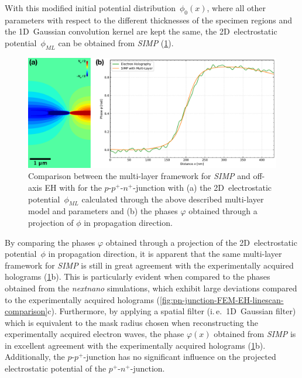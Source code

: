 With this modified initial potential distribution~$\phi_0 \left(x\right)$, where all other parameters with respect to the different thicknesses of the specimen regions and the 1D~Gaussian convolution kernel are kept the same, the 2D~electrostatic potential~$\phi_{\mathit{ML}}$ can be obtained from \emph{SIMP} (\cref{fig:ppn-junction-SIMP-multilayer-EH-comparison}).
\begin{figure}[H]
	\centering
	\includegraphics[width=\textwidth]{Figures/Results/pn-Junction/Simulations/ppn-junction-SIMP-multilayer-EH-comparison.pdf}
	\caption{Comparison between the multi-layer framework for \emph{SIMP} and off-axis EH with for the $p$-$p^+$-$n^+$-junction with (a) the 2D~electrostatic potential~$\phi_{\mathit{ML}}$ calculated through the above described multi-layer model and parameters and (b) the phases $\varphi$ obtained through a projection of $\phi$ in propagation direction.}
	\label{fig:ppn-junction-SIMP-multilayer-EH-comparison}
\end{figure}
By comparing the phases $\varphi$ obtained through a projection of the 2D~electrostatic potential~$\phi$ in propagation direction, it is apparent that the same multi-layer framework for \emph{SIMP} is still in great agreement with the experimentally acquired holograms (\cref{fig:ppn-junction-SIMP-multilayer-EH-comparison}b). This is particularly evident when compared to the phases obtained from the \emph{nextnano} simulations, which exhibit large deviations compared to the experimentally acquired holograms (\cref{fig:pn-junction-FEM-EH-linescan-comparison}c). Furthermore, by applying a spatial filter (i.\,e.\ 1D~Gaussian filter) which is equivalent to the mask radius chosen when reconstructing the experimentally acquired electron waves, the phase $\varphi\left(x\right)$ obtained from \emph{SIMP} is in excellent agreement with the experimentally acquired holograms (\cref{fig:ppn-junction-SIMP-multilayer-EH-comparison}b). Additionally, the $p$-$p^+$-junction has no significant influence on the projected electrostatic potential of the $p^+$-$n^+$-junction.

